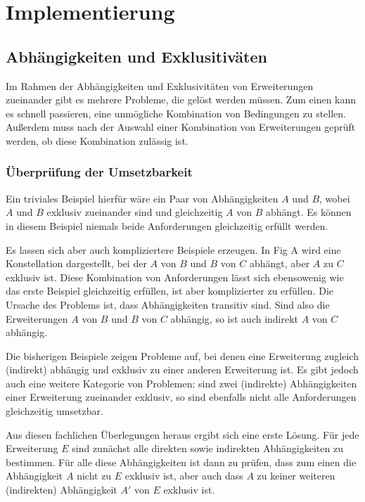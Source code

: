 \section{Implementierung}
\subsection{Abhängigkeiten und Exklusitiväten}
Im Rahmen der Abhängigkeiten und Exklusivitäten von Erweiterungen zueinander gibt es mehrere Probleme, die gelöst werden müssen. Zum einen kann es schnell passieren, eine unmögliche Kombination von Bedingungen zu stellen. Außerdem muss nach der Auswahl einer Kombination von Erweiterungen geprüft werden, ob diese Kombination zulässig ist.

\subsubsection{Überprüfung der Umsetzbarkeit}


Ein triviales Beispiel hierfür wäre ein Paar von Abhängigkeiten $A$ und $B$, wobei $A$ und $B$ exklusiv zueinander sind und gleichzeitig $A$ von $B$ abhängt. Es können in diesem Beispiel niemals beide Anforderungen gleichzeitig erfüllt werden.

Es lassen sich aber auch kompliziertere Beispiele erzeugen. In Fig A wird eine Konstellation dargestellt, bei der $A$ von $B$ und $B$ von $C$ abhängt, aber $A$ zu $C$ exklusiv ist. Diese Kombination von Anforderungen lässt sich ebensowenig wie das erste Beispiel gleichzeitig erfüllen, ist aber komplizierter zu erfüllen. Die Ursache des Problems ist, dass Abhängigkeiten transitiv sind. Sind also die Erweiterungen $A$ von $B$ und $B$ von $C$ abhängig, so ist auch indirekt $A$ von $C$ abhängig.

Die bisherigen Beispiele zeigen Probleme auf, bei denen eine Erweiterung zugleich (indirekt) abhängig und exklusiv zu einer anderen Erweiterung ist. Es gibt jedoch auch eine weitere Kategorie von Problemen: sind zwei (indirekte) Abhängigkeiten einer Erweiterung zueinander exklusiv, so sind ebenfalls nicht alle Anforderungen gleichzeitig umsetzbar.

Aus diesen fachlichen Überlegungen heraus ergibt sich eine erste Lösung. Für jede Erweiterung $E$ sind zunächst alle direkten sowie indirekten Abhängigkeiten zu bestimmen. Für alle diese Abhängigkeiten ist dann zu prüfen, dass zum einen die Abhängigkeit $A$ nicht zu $E$ exklusiv ist, aber auch dass $A$ zu keiner weiteren (indirekten) Abhängigkeit $A'$ von $E$ exklusiv ist.

